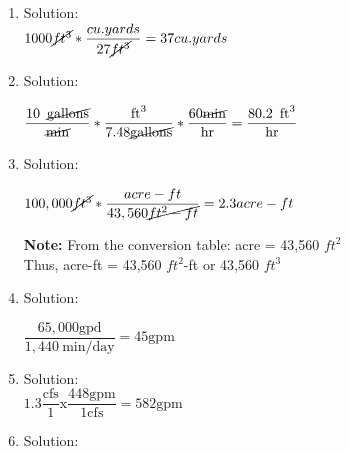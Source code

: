 \begin{enumerate}
\item Solution:\\

$1000 \cancel{ft^3}*\dfrac{cu.yards}{27\cancel{ft^3}} = 37 cu.yards$

\item Solution:\\

\vspace{0.4cm}

$\dfrac{10 \enspace \cancel{\mathrm{gallons}}}{\cancel{\mathrm{min}}}*  \dfrac{\mathrm{ft}^3}{7.48 \cancel{\mathrm{gallons}}}  * \dfrac{60 \cancel{\mathrm{min}}}{\mathrm{hr}}   = \dfrac{80.2 \enspace \mathrm{ft}^3}{\mathrm{hr}}$

\vspace{0.4cm}


\item Solution:\\

\vspace{0.4cm}

$100,000 \cancel{ft^3} * \dfrac{acre-ft}{43,560 \cancel{ft^2-ft}} =  2.3 acre-ft$\\

\vspace{0.2cm}

\textbf{Note:} From the conversion table: acre = 43,560 $ft^2$\\
Thus, acre-ft  = 43,560 $ft^2$-ft or 43,560 $ft^3$\\

\vspace{0.4cm}

\item Solution:\\

\vspace{0.4cm}

$
\dfrac{65,000 \mathrm{gpd}}{1,440 \mathrm{~min} / \mathrm{day}}=45 \mathrm{gpm}
$

\vspace{0.4cm}

\item Solution:\\
$
1.3 \dfrac{\mathrm{cfs}}{1} \mathrm{x} \dfrac{448 \mathrm{gpm}}{1 \mathrm{cfs}}=582 \mathrm{gpm}
$

\vspace{0.4cm}

\item Solution:\\


\end{enumerate}
